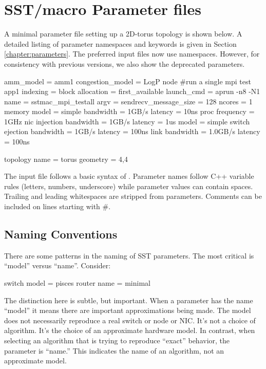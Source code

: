 
\section{SST/macro Parameter files}
\label{sec:parameters}
A minimal parameter file setting up a 2D-torus topology is shown below. 
A detailed listing of parameter namespaces and keywords is given in Section \ref{chapter:parameters}.
The preferred input files now use namespaces.
However, for consistency with previous versions, we also show the deprecated parameters.

\begin{ViFile}
amm_model = amm1
congestion_model = LogP
node {
 #run a single mpi test
 app1 {
  indexing = block
  allocation = first_available
  launch_cmd = aprun -n8 -N1
  name = sstmac_mpi_testall
  argv =
  sendrecv_message_size = 128
 }
 ncores = 1
 memory {
  model = simple
  bandwidth = 1GB/s
  latency = 10ns
 }
 proc {
  frequency = 1GHz
 }
 nic {
  injection {
   bandwidth = 1GB/s
   latency = 1us
  }
  model = simple
 }
}
switch {
 ejection {
  bandwidth = 1GB/s
  latency = 100ns
 }
 link {
  bandwidth = 1.0GB/s
   latency = 100ns
 }
}

topology {
 name = torus
 geometry = 4,4
}
\end{ViFile}
The input file follows a basic syntax of .  
Parameter names follow C++ variable rules (letters, numbers, underscore) while parameter values can contain spaces.  Trailing and leading whitespaces are stripped from parameters.
Comments can be included on lines starting with \#.

\subsection{Naming Conventions}
There are some patterns in the naming of SST parameters. The most critical is ``model'' versus ``name''. Consider:

\begin{CppCode}

switch {
 model = pisces
 router {
  name = minimal
 }
}
\end{CppCode}

The distinction here is subtle, but important. When a parameter has the name ``model'' it means there are important approximations being made.
The model does not necessarily reproduce a real switch or node or NIC.
It's not a choice of algorithm. It's the choice of an approximate hardware model.
In contrast, when selecting an algorithm that is trying to reproduce ``exact'' behavior, the parameter is ``name.''
This indicates the name of an algorithm, not an approximate model.


